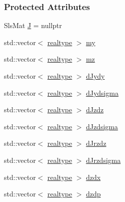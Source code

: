 \subsubsection*{Protected Attributes}
\begin{DoxyCompactItemize}
\item 
Sls\+Mat \mbox{\hyperlink{classamici_1_1_model_a71cc1d93543998249a172328e1a4dbcd}{J}} = nullptr
\item 
std\+::vector$<$ \mbox{\hyperlink{namespaceamici_a1bdce28051d6a53868f7ccbf5f2c14a3}{realtype}} $>$ \mbox{\hyperlink{classamici_1_1_model_ab9db87a0acf848c904c792edab3b5828}{my}}
\item 
std\+::vector$<$ \mbox{\hyperlink{namespaceamici_a1bdce28051d6a53868f7ccbf5f2c14a3}{realtype}} $>$ \mbox{\hyperlink{classamici_1_1_model_afff14791b6839ad61750cc360e44e890}{mz}}
\item 
std\+::vector$<$ \mbox{\hyperlink{namespaceamici_a1bdce28051d6a53868f7ccbf5f2c14a3}{realtype}} $>$ \mbox{\hyperlink{classamici_1_1_model_a3ac4a9286766476c57fba8edbb2da345}{d\+Jydy}}
\item 
std\+::vector$<$ \mbox{\hyperlink{namespaceamici_a1bdce28051d6a53868f7ccbf5f2c14a3}{realtype}} $>$ \mbox{\hyperlink{classamici_1_1_model_a32c9ff2e3e5e1fa69bd54ca0ceb41876}{d\+Jydsigma}}
\item 
std\+::vector$<$ \mbox{\hyperlink{namespaceamici_a1bdce28051d6a53868f7ccbf5f2c14a3}{realtype}} $>$ \mbox{\hyperlink{classamici_1_1_model_a6f9b92825da48e6a4b879a31670626f9}{d\+Jzdz}}
\item 
std\+::vector$<$ \mbox{\hyperlink{namespaceamici_a1bdce28051d6a53868f7ccbf5f2c14a3}{realtype}} $>$ \mbox{\hyperlink{classamici_1_1_model_adb1036c3ad16c2b4c48b71452eab63c7}{d\+Jzdsigma}}
\item 
std\+::vector$<$ \mbox{\hyperlink{namespaceamici_a1bdce28051d6a53868f7ccbf5f2c14a3}{realtype}} $>$ \mbox{\hyperlink{classamici_1_1_model_a80eade42075bbd373d5531c6fd7cd877}{d\+Jrzdz}}
\item 
std\+::vector$<$ \mbox{\hyperlink{namespaceamici_a1bdce28051d6a53868f7ccbf5f2c14a3}{realtype}} $>$ \mbox{\hyperlink{classamici_1_1_model_ad38f72dc10596ffb60d0472dc4b7eade}{d\+Jrzdsigma}}
\item 
std\+::vector$<$ \mbox{\hyperlink{namespaceamici_a1bdce28051d6a53868f7ccbf5f2c14a3}{realtype}} $>$ \mbox{\hyperlink{classamici_1_1_model_a2f5f73b0bb67ee69c461c01e2dadaecc}{dzdx}}
\item 
std\+::vector$<$ \mbox{\hyperlink{namespaceamici_a1bdce28051d6a53868f7ccbf5f2c14a3}{realtype}} $>$ \mbox{\hyperlink{classamici_1_1_model_a5d743131ef6be8aa56865fd100acd137}{dzdp}}

\end{DoxyCompactItemize}
